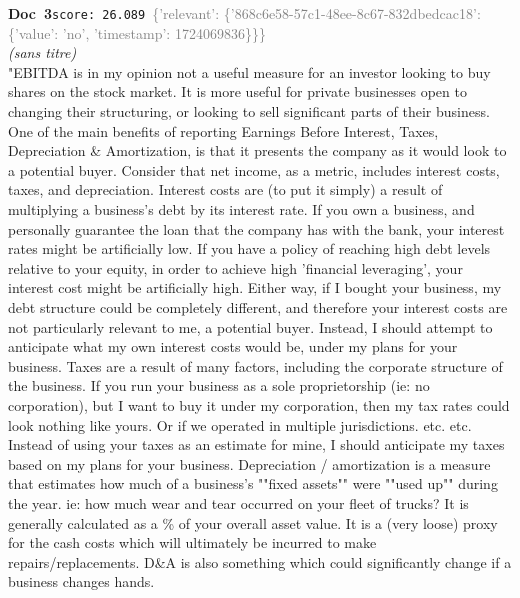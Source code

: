 \documentclass[a4paper,11pt]{article}
\begin{document}
\begin{docenv}
{\footnotesize\textcolor{doccolor}{\textbf{Doc~3}}}\hfill{\tiny\texttt{score:~26.089}}\ {\tiny\textcolor{gray}{\{'relevant': \{'868c6e58-57c1-48ee-8c67-832dbedcac18': \{'value': 'no', 'timestamp': 1724069836\}\}\}}}\\[3pt]
{\small\textit{(sans titre)}}\\[2pt]
\vspace{2pt}
{\footnotesize 
"EBITDA is in my opinion not a useful measure for an investor looking to buy shares on the stock market. It is more useful for private businesses open to changing their structuring, or looking to sell significant parts of their business. One of the main benefits of reporting Earnings Before Interest, Taxes, Depreciation \& Amortization, is that it presents the company as it would look to a potential buyer. Consider that net income, as a metric, includes interest costs, taxes, and depreciation. Interest costs are (to put it simply) a result of multiplying a business's debt by its interest rate. If you own a business, and personally guarantee the loan that the company has with the bank, your interest rates might be artificially low. If you have a policy of reaching high debt levels relative to your equity, in order to achieve high 'financial leveraging', your interest cost might be artificially high. Either way, if I bought your business, my debt structure could be completely different, and therefore your interest costs are not particularly relevant to me, a potential buyer. Instead, I should attempt to anticipate what my own interest costs would be, under my plans for your business. Taxes are a result of many factors, including the corporate structure of the business. If you run your business as a sole proprietorship (ie: no corporation), but I want to buy it under my corporation, then my tax rates could look nothing like yours. Or if we operated in multiple jurisdictions. etc. etc. Instead of using your taxes as an estimate for mine, I should anticipate my taxes based on my plans for your business. Depreciation / amortization is a measure that estimates how much of a business's ""fixed assets"" were ""used up"" during the year. ie: how much wear and tear occurred on your fleet of trucks? It is generally calculated as a \% of your overall asset value. It is a (very loose) proxy for the cash costs which will ultimately be incurred to make repairs/replacements. D\&A is also something which could significantly change if a business changes hands.}
\end{docenv}
\end{document}
